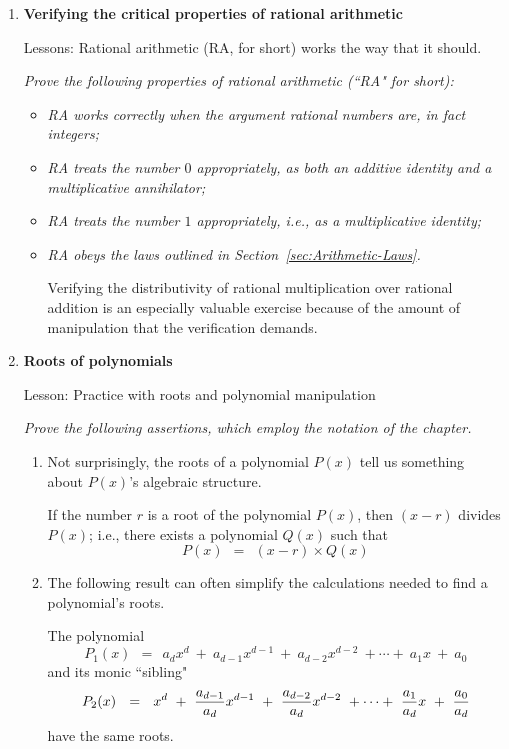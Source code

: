 \begin{enumerate}
\medskip\item
{\bf Verifying the critical properties of rational arithmetic}

{\sc Lessons:} Rational arithmetic (RA, for short) works the way that it should.

\smallskip

{\em Prove the following properties of rational arithmetic (``RA" for short):}
\begin{itemize}
\item
{\em RA works correctly when the argument rational numbers are, in fact integers;}
\medskip\item
{\em RA treats the number $0$ appropriately, as both an additive identity and a multiplicative annihilator;}
\medskip\item
{\em RA treats the number $1$ appropriately, i.e., as a multiplicative identity;}
\medskip\item
{\em RA obeys the laws outlined in Section~\ref{sec:Arithmetic-Laws}.}

\smallskip

Verifying the distributivity of rational multiplication over rational addition is an especially valuable exercise because of the amount of manipulation that the verification demands.
\end{itemize}

\medskip\item
{\bf Roots of polynomials}

{\sc Lesson:} Practice with roots and polynomial manipulation

\smallskip

{\em Prove the following assertions, which employ the notation of the chapter.}
  \begin{enumerate}
  \item
Not surprisingly, the roots of a polynomial $P(x)$ tell us something about $P(x)$'s algebraic structure.

\begin{prop}
If the number $r$ is a root of the polynomial $P(x)$, then $(x-r)$ divides $P(x)$; i.e., there exists a polynomial $Q(x)$ such that
\[ P(x) \ \ = \ \ (x-r) \times Q(x) \]
\end{prop}
  
  \medskip\item
The following result can often simplify the calculations needed to find a polynomial's roots.

\begin{prop}
The polynomial
\[ P_1(x) \ \ = \ \ a_d x^d \ + \ a_{d-1} x^{d-1} \ + \ a_{d-2} x^{d-2} \ + \cdots + \ a_1 x \ + \ a_0 \]
and its monic ``sibling"
\[ P_2(x) \ \ = \ \ x^d \ + \ {a_{d-1} \over a_d } x^{d-1} \ + \ {a_{d-2} \over a_d } x^{d-2} \ + \cdots + \ {a_1 \over a_d } x \ + \ {a_0  \over a_d }
\]
have the same roots.
\end{prop}


\end{enumerate}
\end{enumerate}

